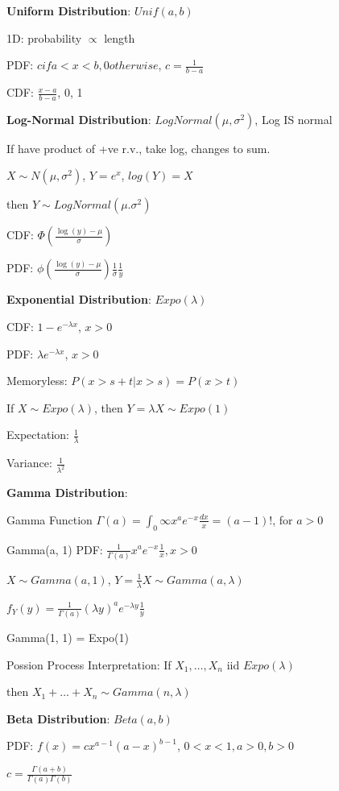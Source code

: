 \documentclass[10pt, a4paper]{article}
\newcommand{\red}[1]{{\color{red}#1}}
\begin{document}
\begin{multicols*}{3}
		\textbf{Uniform Distribution}: $Unif(a, b)$

		1D: probability $\propto$ length

		PDF: $c if a < x < b, 0 otherwise$, $c = \frac{1}{b - a}$

		CDF: $\frac{x - a}{b - a}$, 0, 1

		\textbf{Log-Normal Distribution}: $LogNormal(\mu, \sigma^2)$, Log IS normal

		If have product of +ve r.v., take log, changes to sum. 

		$X \sim N(\mu, \sigma^2)$, $Y = e^x$, $log(Y) = X$

		then $Y \sim LogNormal(\mu. \sigma ^2)$

		CDF: $\Phi(\frac{\log(y) - \mu}{\sigma})$

		PDF: $\phi(\frac{\log(y) - \mu}{\sigma}) \frac{1}{\sigma} \frac{1}{y}$

		\textbf{Exponential Distribution}: $Expo(\lambda)$

		CDF: $1 - e^{-\lambda x}$, $x > 0$

		PDF: $\lambda e^{-\lambda x}$, $x > 0$

		\red{Memoryless}: $P(x > s + t | x > s) = P(x > t)$

		If $X \sim Expo(\lambda)$, then $Y = \lambda X \sim Expo(1)$

		Expectation: $\frac{1}{\lambda}$

		Variance: $\frac{1}{\lambda^2}$

		\textbf{Gamma Distribution}:

		Gamma Function $\Gamma(a) = \int_{0}{\infty} x^a e^{-x} \frac{dx}{x} = (a - 1)!$, for $a > 0$ 

		Gamma(a, 1) PDF: $\frac{1}{\Gamma(a)} x^a e^{-x} \frac{1}{x}, x > 0$

		$X \sim Gamma(a, 1)$, $Y = \frac{1}{\lambda}X \sim Gamma(a, \lambda)$

		$f_Y(y) = \frac{1}{\Gamma(a)}(\lambda y)^a e^{-\lambda y} \frac{1}{y}$

		Gamma(1, 1) = Expo(1)

		Possion Process Interpretation: If $X_1, \dots, X_n$ iid $Expo(\lambda)$

		then $X_1 + \dots + X_n \sim Gamma(n, \lambda)$

		\textbf{Beta Distribution}: $Beta(a,b)$

		PDF: $f(x) = cx^{a - 1}(a - x)^{b-1}$, $0 < x < 1, a > 0, b > 0$

		$c = \frac{\Gamma(a + b)}{\Gamma(a)\Gamma(b)}$


\end{multicols*}
\end{document}
